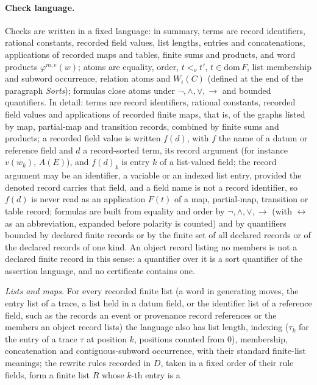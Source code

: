 \paragraph{Check language.} Checks are written in a fixed language: in summary, terms are record identifiers, rational constants, recorded field values, list lengths, entries and concatenations, applications of recorded maps and tables, finite sums and products, and word products \(\varphi^{m,e}(w)\); atoms are equality, order, \(t<_o t'\), \(t\in\mathrm{dom}\,F\), list membership and subword occurrence, relation atoms and \(W_i(C)\) (defined at the end of the paragraph \emph{Sorts}); formulas close atoms under \(\neg,\wedge,\vee,\to\) and bounded quantifiers. In detail: terms are record identifiers,
rational constants, recorded field values and applications of recorded finite
maps, that is, of the graphs listed by map, partial-map and transition records, combined by finite sums and products; a recorded field value is written \(f(d)\), with \(f\) the name of a datum or reference field and \(d\) a record-sorted term, its record argument (for instance \(v(w_k)\), \(A(E)\)), and \(f(d)_k\) is entry \(k\) of a list-valued field; the record argument may be an identifier, a variable or an indexed list entry, provided the denoted record carries that field, and a field name is not a record identifier, so \(f(d)\) is never read as an application \(F(t)\) of a map, partial-map, transition or table record; formulas are built from equality
and order by \(\neg,\wedge,\vee,\to\) (with \(\leftrightarrow\) as an abbreviation,
expanded before polarity is counted) and by quantifiers bounded by declared finite
records or by the finite set of all declared records or of the declared records of one kind. An object record listing no members is not a declared finite record in this sense: a quantifier over it is a sort quantifier of the assertion language, and no certificate contains one.
\par\emph{Lists and maps.} For every recorded finite list (a word in generating moves, the entry list
of a trace, a list held in a datum field, or the identifier list of a
reference field, such as the records an event or provenance record references
or the members an object record lists) the language also has list
length, indexing (\(\tau_k\) for the entry of a trace \(\tau\) at position \(k\), positions counted from \(0\)),
membership, concatenation and contiguous-subword occurrence, with their
standard finite-list meanings; the rewrite rules recorded in \(D\), taken in a
fixed order of their rule fields, form a finite list \(R\) whose \(k\)-th entry is a
